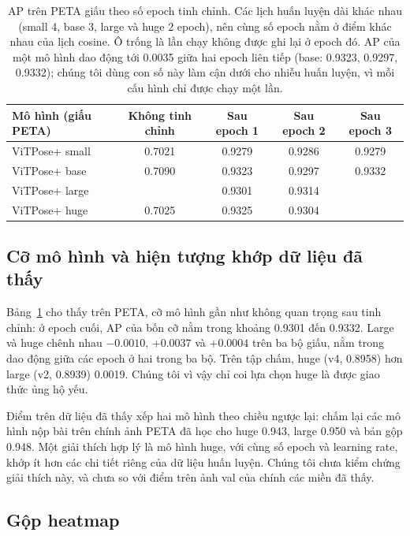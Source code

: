 \documentclass[11pt,a4paper]{article}
\begin{document}
\begin{table}[H]
\centering\small
\begin{tabular}{@{}lcccc@{}}
\toprule
Mô hình (giấu PETA) & Không tinh chỉnh & Sau epoch 1 & Sau epoch 2 & Sau epoch 3 \\
\midrule
ViTPose+ small & 0.7021 & 0.9279 & 0.9286 & 0.9279 \\
ViTPose+ base & 0.7090 & 0.9323 & 0.9297 & 0.9332 \\
ViTPose+ large & & 0.9301 & 0.9314 & \\
ViTPose+ huge & 0.7025 & 0.9325 & 0.9304 & \\
\bottomrule
\end{tabular}
\caption{AP trên PETA giấu theo số epoch tinh chỉnh. Các lịch huấn luyện dài khác nhau (small 4, base 3, large và huge 2 epoch), nên cùng số epoch nằm ở điểm khác nhau của lịch cosine. Ô trống là lần chạy không được ghi lại ở epoch đó. AP của một mô hình dao động tới 0.0035 giữa hai epoch liên tiếp (base: 0.9323, 0.9297, 0.9332); chúng tôi dùng con số này làm cận dưới cho nhiễu huấn luyện, vì mỗi cấu hình chỉ được chạy một lần.}
\label{tab:epochs}
\end{table}

\subsection{Cỡ mô hình và hiện tượng khớp dữ liệu đã thấy}
\label{sec:size}

Bảng~\ref{tab:epochs} cho thấy trên PETA, cỡ mô hình gần như không quan trọng sau tinh chỉnh: ở epoch cuối, AP của bốn cỡ nằm trong khoảng 0.9301 đến 0.9332. Large và huge chênh nhau $-0.0010$, $+0.0037$ và $+0.0004$ trên ba bộ giấu, nằm trong dao động giữa các epoch ở hai trong ba bộ. Trên tập chấm, huge (v4, 0.8958) hơn large (v2, 0.8939) 0.0019. Chúng tôi vì vậy chỉ coi lựa chọn huge là được giao thức ủng hộ yếu.

Điểm trên dữ liệu đã thấy xếp hai mô hình theo chiều ngược lại: chấm lại các mô hình nộp bài trên chính ảnh PETA đã học cho huge 0.943, large 0.950 và bản gộp 0.948. Một giải thích hợp lý là mô hình huge, với cùng số epoch và learning rate, khớp ít hơn các chi tiết riêng của dữ liệu huấn luyện. Chúng tôi chưa kiểm chứng giải thích này, và chưa so với điểm trên ảnh val của chính các miền đã thấy.

\subsection{Gộp heatmap}
\end{document}
